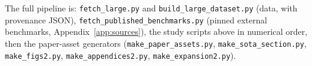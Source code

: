 The full pipeline is: \texttt{fetch\_large.py} and
\texttt{build\_large\_dataset.py} (data, with provenance JSON),
\texttt{fetch\_published\_benchmarks.py} (pinned external benchmarks,
Appendix~\ref{app:sources}), the study scripts above in numerical order,
then the paper-asset generators (\texttt{make\_paper\_assets.py},
\texttt{make\_sota\_section.py}, \texttt{make\_figs2.py},
\texttt{make\_appendices2.py}, \texttt{make\_expansion2.py}).
